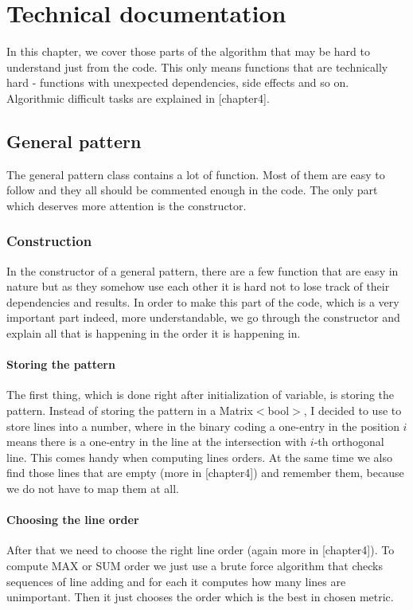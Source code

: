 \chapter{Technical documentation}
In this chapter, we cover those parts of the algorithm that may be hard to understand just from the code. This only means functions that are technically hard - functions with unexpected dependencies, side effects and so on. Algorithmic difficult tasks are explained in [chapter4].

\section{General pattern}
The general pattern class contains a lot of function. Most of them are easy to follow and they all should be commented enough in the code. The only part which deserves more attention is the constructor.

\subsection{Construction}
In the constructor of a general pattern, there are a few function that are easy in nature but as they somehow use each other it is hard not to lose track of their dependencies and results. In order to make this part of the code, which is a very important part indeed, more understandable, we go through the constructor and explain all that is happening in the order it is happening in.

\subsubsection{Storing the pattern}
The first thing, which is done right after initialization of variable, is storing the pattern. Instead of storing the pattern in a Matrix$<$bool$>$, I decided to use to store lines into a number, where in the binary coding a one-entry in the position $i$ means there is a one-entry in the line at the intersection with $i$-th orthogonal line. This comes handy when computing lines orders. At the same time we also find those lines that are empty (more in [chapter4]) and remember them, because we do not have to map them at all.

\subsubsection{Choosing the line order}
After that we need to choose the right line order (again more in [chapter4]). To compute MAX or SUM order we just use a brute force algorithm that checks sequences of line adding and for each it computes how many lines are unimportant. Then it just chooses the order which is the best in chosen metric.

